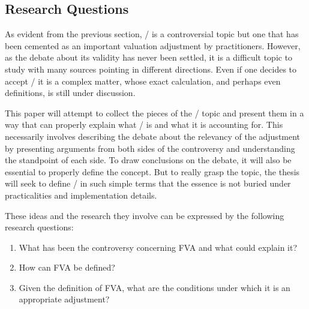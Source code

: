 \documentclass[main.tex]{subfiles}
\begin{document}
    \subsection{Research Questions}
        
    As evident from the previous section, \FVA/ is a controversial topic 
    but one that has been cemented as an important valuation adjustment by practitioners.
    However, as the debate about its validity has never been settled,
    it is a difficult topic to study with many sources pointing in different directions.
    Even if one decides to accept \FVA/ it is a complex matter,
    whose exact calculation, and perhaps even definitions, is still under discussion.

    This paper will attempt to collect the pieces of the \FVA/ topic
    and present them in a way that can properly explain what \FVA/ is and what it is accounting for.
    This necessarily involves describing the debate about the relevancy of the adjustment
    by presenting arguments from both sides of the controversy 
    and understanding the standpoint of each side.
    To draw conclusions on the debate, it will also be essential to properly define the concept.
    But to really grasp the topic, the thesis will seek to define \FVA/ in such simple terms 
    that the essence is not buried under practicalities and implementation details.

    These ideas and the research they involve can be expressed by the following research questions:
    \begin{enumerate}
        \item What has been the controversy concerning FVA and what could explain it?
        \item How can FVA be defined?
        \item Given the definition of FVA, 
              what are the conditions under which it is an appropriate adjustment?
    \end{enumerate}
\end{document}
